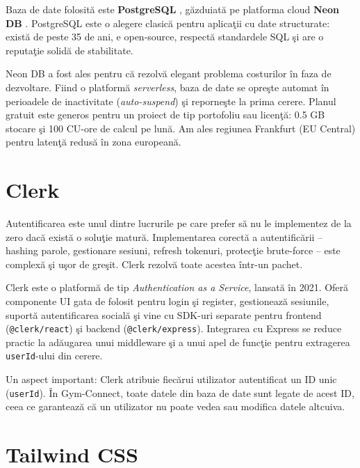 Baza de date folosit\u a este \textbf{PostgreSQL}
\cite{postgresql2024}, g\u azduiat\u a pe platforma cloud
\textbf{Neon DB} \cite{neon2024}. PostgreSQL este o alegere
clasic\u a pentru aplica\c tii cu date structurate: exist\u a
de peste 35 de ani, e open-source, respect\u a standardele
SQL \c si are o reputa\c tie solid\u a de stabilitate.

Neon DB a fost ales pentru c\u a rezolv\u a elegant problema
costurilor \^ in faza de dezvoltare. Fiind o platform\u a
\textit{serverless}, baza de date se opre\c ste automat
\^ in perioadele de inactivitate (\textit{auto-suspend}) \c si
reporne\c ste la prima cerere. Planul gratuit este generos
pentru un proiect de tip portofoliu sau licen\c t\u a:
0.5 GB stocare \c si 100 CU-ore de calcul pe lun\u a.
Am ales regiunea Frankfurt (EU Central) pentru laten\c t\u a
redus\u a \^ in zona european\u a.

\section{Clerk}

Autentificarea este unul dintre lucrurile pe care prefer s\u a
nu le implementez de la zero dac\u a exist\u a o solu\c tie
matur\u a. Implementarea corect\u a a autentific\u arii --
hashing parole, gestionare sesiuni, refresh tokenuri,
protec\c tie brute-force -- este complex\u a \c si u\c sor
de gre\c sit. Clerk \cite{clerk2024} rezolv\u a toate
acestea \^ intr-un pachet.

Clerk este o platform\u a de tip \textit{Authentication as
a Service}, lansat\u a \^ in 2021. Ofer\u a componente UI
gata de folosit pentru login \c si register, gestioneaz\u a
sesiunile, suport\u a autentificarea social\u a \c si vine
cu SDK-uri separate pentru frontend (\texttt{@clerk/react})
\c si backend (\texttt{@clerk/express}). Integrarea cu
Express se reduce practic la ad\u augarea unui middleware
\c si a unui apel de func\c tie pentru extragerea
\texttt{userId}-ului din cerere.

Un aspect important: Clerk atribuie fiec\u arui utilizator
autentificat un ID unic (\texttt{userId}). \^ In Gym-Connect,
toate datele din baza de date sunt legate de acest ID, ceea
ce garanteaz\u a c\u a un utilizator nu poate vedea sau
modifica datele altcuiva.

\section{Tailwind CSS}

